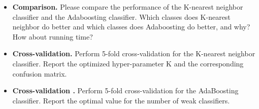 \documentclass[11pt]{article}
\begin{document}
    \begin{itemize}
        \item \textbf{Comparison.} Please compare the performance of the K-nearest neighbor classifier and the
        Adaboosting classifier. Which classes does K-nearest neighbor do better and which classes does Adaboosting do better, and
        why? How about running time?

        \item \textbf{Cross-validation.} Perform 5-fold cross-validation for the K-nearest neighbor classifier. Report the
        optimized hyper-parameter K and the corresponding confusion matrix.

        \item \textbf{Cross-validation .} Perform 5-fold cross-validation for the AdaBoosting classifier.
        Report the optimal value for the number of weak classifiers.
    \end{itemize}
\end{document}
